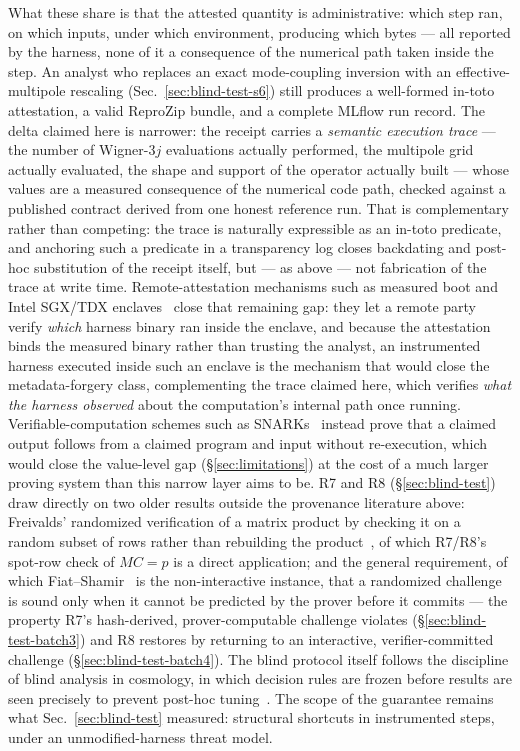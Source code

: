 \documentclass[11pt]{article}
\begin{document}
What these share is that the attested quantity is administrative: which step
ran, on which inputs, under which environment, producing which bytes --- all
reported by the harness, none of it a consequence of the numerical path taken
inside the step. An analyst who replaces an exact mode-coupling inversion
with an effective-multipole rescaling (Sec.~\ref{sec:blind-test-s6}) still
produces a well-formed in-toto attestation, a valid ReproZip bundle, and a
complete MLflow run record. The delta claimed here is narrower: the receipt
carries a \emph{semantic execution trace} --- the number of Wigner-3\(j\)
evaluations actually performed, the multipole grid actually evaluated, the
shape and support of the operator actually built --- whose values are a
measured consequence of the numerical code path, checked against a published
contract derived from one honest reference run. That is complementary rather
than competing: the trace is naturally expressible as an in-toto predicate,
and anchoring such a predicate in a transparency log closes backdating and
post-hoc substitution of the receipt itself, but --- as above --- not
fabrication of the trace at write time. Remote-attestation
mechanisms such as measured boot and Intel SGX/TDX enclaves~\cite{CostanDevadas2016}
close that remaining gap: they let a remote party
verify \emph{which} harness binary ran inside the enclave, and because the
attestation binds the measured binary rather than trusting the analyst, an
instrumented harness executed inside such an enclave is the mechanism that
would close the metadata-forgery class, complementing the trace claimed here,
which verifies \emph{what the harness observed} about the computation's
internal path once running. Verifiable-computation
schemes such as SNARKs~\cite{BenSasson2014} instead prove that a claimed
output follows from a claimed program and input without re-execution, which
would close the value-level gap (\S\ref{sec:limitations}) at the cost of a
much larger proving system than this narrow layer aims to be. R7 and R8
(\S\ref{sec:blind-test}) draw directly
on two older results outside the provenance literature above: Freivalds'
randomized verification of a matrix product by checking it on a random
subset of rows rather than rebuilding the product~\cite{Freivalds1979}, of
which R7/R8's spot-row check of
\(MC=p\) is a direct application; and the general requirement, of which
Fiat--Shamir~\cite{FiatShamir1986} is the non-interactive instance, that a
randomized challenge is sound only when it cannot be predicted by the prover
before it commits --- the property R7's hash-derived, prover-computable
challenge violates (\S\ref{sec:blind-test-batch3}) and R8 restores by
returning to an interactive, verifier-committed challenge
(\S\ref{sec:blind-test-batch4}). The
blind protocol itself follows the discipline of blind analysis in
cosmology, in which decision rules are frozen before results are seen
precisely to prevent post-hoc tuning~\cite{KleinRoodman2005}. The scope of the
guarantee remains what Sec.~\ref{sec:blind-test} measured: structural
shortcuts in instrumented steps, under an unmodified-harness threat model.
\end{document}
